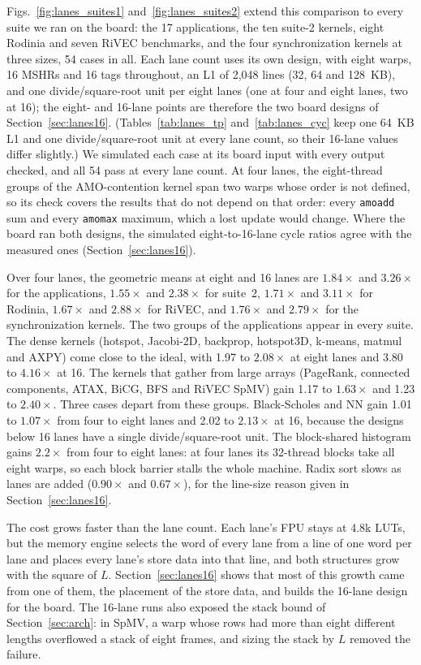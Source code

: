 \documentclass[journal]{IEEEtran}
\begin{document}
Figs.~\ref{fig:lanes_suites1} and~\ref{fig:lanes_suites2} extend this comparison to
every suite we ran on the board: the 17 applications, the ten suite-2 kernels, eight
Rodinia and seven RiVEC benchmarks, and the four synchronization kernels at three
sizes, 54 cases in all. Each lane count uses its own design, with eight warps, 16
MSHRs and 16 tags throughout, an L1 of 2,048 lines (32, 64 and 128~KB), and one
divide/square-root unit per eight lanes (one at four and eight lanes, two at 16); the
eight- and 16-lane points are therefore the two board designs of
Section~\ref{sec:lanes16}. (Tables~\ref{tab:lanes_tp} and~\ref{tab:lanes_cyc} keep one
64~KB L1 and one divide/square-root unit at every lane count, so their 16-lane values
differ slightly.) We simulated each case at its board input with every output
checked, and all 54 pass at every lane count. At four lanes, the eight-thread groups of
the AMO-contention kernel span two warps whose order is not defined, so its check
covers the results that do not depend on that order: every \texttt{amoadd} sum and
every \texttt{amomax} maximum, which a lost update would change. Where the board ran
both designs, the simulated eight-to-16-lane cycle ratios agree with the measured ones
(Section~\ref{sec:lanes16}).

Over four lanes, the geometric means at eight and 16 lanes are $1.84\times$ and
$3.26\times$ for the applications, $1.55\times$ and $2.38\times$ for suite~2,
$1.71\times$ and $3.11\times$ for Rodinia, $1.67\times$ and $2.88\times$ for RiVEC, and
$1.76\times$ and $2.79\times$ for the synchronization kernels. The two groups of the
applications appear in every suite. The dense kernels (hotspot, Jacobi-2D, backprop,
hotspot3D, k-means, matmul and AXPY) come close to the ideal, with 1.97 to $2.08\times$
at eight lanes and 3.80 to $4.16\times$ at 16. The kernels that gather from large
arrays (PageRank, connected components, ATAX, BiCG, BFS and RiVEC SpMV) gain 1.17 to
$1.63\times$ and 1.23 to $2.40\times$. Three cases depart from these groups.
Black-Scholes and NN gain 1.01 to $1.07\times$ from four to eight lanes and 2.02 to
$2.13\times$ at 16, because the designs below 16 lanes have a single divide/square-root
unit. The block-shared histogram gains $2.2\times$ from four to eight lanes: at four
lanes its 32-thread blocks take all eight warps, so each block barrier stalls the whole
machine. Radix sort slows as lanes are added ($0.90\times$ and $0.67\times$), for the
line-size reason given in Section~\ref{sec:lanes16}.

The cost grows faster
than the lane count. Each lane's FPU stays at 4.8k LUTs, but the memory engine
selects the word of every lane from a line of one word per lane and places every
lane's store data into that line, and both structures grow with the square of $L$.
Section~\ref{sec:lanes16} shows that most of this growth came from one of them, the
placement of the store data, and builds the 16-lane design for the board. The 16-lane
runs also exposed the stack bound of Section~\ref{sec:arch}: in SpMV, a warp whose
rows had more than eight different lengths overflowed a stack of eight frames, and
sizing the stack by $L$ removed the failure.
\end{document}
